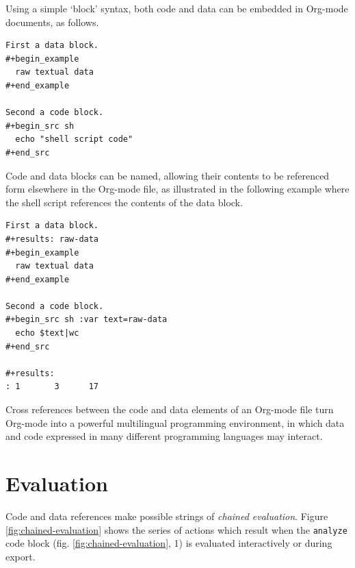 \documentclass[11pt]{article}
\begin{document}
Using a simple `block' syntax, both code and data can be embedded in
Org-mode documents, as follows.

\begin{verbatim}
First a data block.
#+begin_example
  raw textual data
#+end_example

Second a code block.
#+begin_src sh
  echo "shell script code"
#+end_src
\end{verbatim}

Code and data blocks can be named, allowing their contents to be
referenced form elsewhere in the Org-mode file, as illustrated in the
following example where the shell script references the contents of
the data block.

\begin{verbatim}
First a data block.
#+results: raw-data
#+begin_example
  raw textual data
#+end_example

Second a code block.
#+begin_src sh :var text=raw-data
  echo $text|wc
#+end_src

#+results:
: 1       3      17
\end{verbatim}

Cross references between the code and data elements of an
Org-mode file turn Org-mode into a powerful multilingual programming
environment, in which data and code expressed in many different
programming languages may interact.
\section{Evaluation}
\label{sec-3}

Code and data references make possible strings of \emph{chained evaluation}.  Figure \ref{fig:chained-evaluation} shows the series of
actions which result when the \texttt{analyze} code block
(fig. \ref{fig:chained-evaluation}, 1) is evaluated
interactively or during export.
\end{document}
